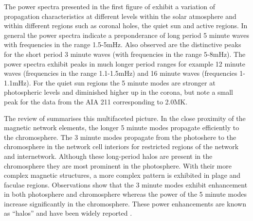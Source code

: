 \documentclass[linenumbers]{aastex63}
\begin{document}









The power spectra presented in the first figure of \citet{Griffiths2018b} exhibit a variation of propagation characteristics at different levels within the solar atmosphere and within different regions such as coronal holes, the quiet sun and active regions. In general the power spectra indicate a preponderance of long period 5 minute waves with frequencies in the range 1.5-5mHz. Also observed are the distinctive peaks for the short period 3 minute waves (with frequencies in the range 5-8mHz). The power spectra exhibit peaks in much longer period ranges for example 12 minute waves  (frequencies in the range 1.1-1.5mHz)  and 16 minute waves (frequencies 1-1.1mHz). For the quiet sun regions the 5 minute modes are stronger at photospheric levels and diminished higher up in the corona, but note a small peak for the data from the AIA 211 corresponding to 2.0MK. 


The review of \citet{Khomenko2013} summarises this multifaceted picture. In the close proximity of the magnetic network elements, the longer 5 minute modes propagate efficiently to the chromosphere. The 3 minute modes propagate from the photoshere to the chromosphere in the network cell interiors for restricted regions of the network and internetwork. Although these long-period halos are present in the chromosphere they are most prominent in the photosphere. With their more complex magnetic structures, a more complex pattern is exhibited in plage and faculae regions. Observations show that the 3 minute modes exhibit enhancement in both photosphere and chromosphere whereas the power of the 5 minute modes increase significantly in the chromosphere. These power enhancements are known as “halos” and have been widely reported \citet{Kontogiannis2010}. 
\end{document}
